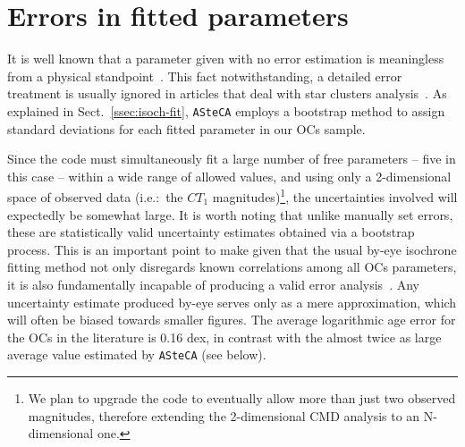 \documentclass[a4paper,fleqn,usenatbib]{mnras}
\begin{document}

\section{Errors in fitted parameters}
\label{sec:errors-fit}

It is well known that a parameter given with no error estimation is
meaningless from a physical standpoint~\citep{Dolphin_2002,Andrae_2010}.
%
This fact notwithstanding, a detailed error treatment is usually ignored in
articles that deal with star clusters analysis~\citep{Paunzen_2006}.
As explained in Sect.~\ref{ssec:isoch-fit}, \texttt{ASteCA} employs a bootstrap
method to assign standard deviations for each fitted parameter in our OCs
sample.

Since the code must simultaneously fit a large number of free parameters --
five in this case -- within a wide range of allowed values, and using only a
2-dimensional space of observed data (i.e.:\ the $CT_1$
magnitudes)\footnote{We plan to upgrade the code to eventually allow
more than just two observed magnitudes, therefore extending the 2-dimensional
CMD analysis to an N-dimensional one.}, the uncertainties involved will
expectedly be somewhat large.
%
It is worth noting that unlike manually set errors, these are
statistically valid uncertainty estimates obtained via a bootstrap process.
This is an important point to make given that the usual by-eye isochrone fitting
method not only disregards known correlations among all OCs parameters,
it is also fundamentally incapable of producing a valid error
analysis~\citep{Naylor_2006}. Any uncertainty estimate produced by-eye serves
only as a mere approximation, which will often be biased towards smaller
figures. The average logarithmic age error for the OCs in the literature is 0.16
dex, in contrast with the almost twice as large average value estimated by
\texttt{ASteCA} (see below).
\end{document}
